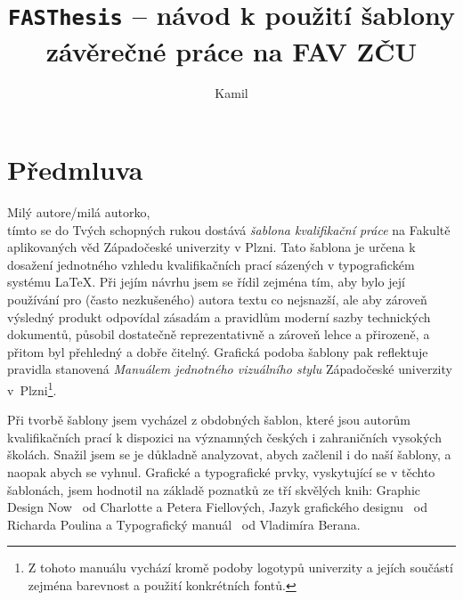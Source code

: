 \documentclass[czech, ing, kiv, he, iso690alph]{fasthesis}
\title{\texttt{FASThesis} -- návod k použití šablony závěrečné práce na FAV ZČU}
\author{Kamil}{Ekštein}{Ing.}{Ph.D.}
\begin{document}
\frontpages[tm] %
\tableofcontents
% 
%
\makeatletter%
\ifx\FASThesis@style\c@fullcolor%
\else%
\fi%
\makeatother%
%
%
%
%
\chapter*[Předmluva]{Předmluva}
Milý autore/milá autorko,\\[\baselineskip]
tímto se do Tvých schopných rukou dostává \emph{šablona kvalifikační práce} na Fakultě aplikovaných věd Západočeské univerzity v Plzni. Tato šablona je určena k dosažení jednotného vzhledu kvalifikačních prací sázených v typografickém systému \LaTeX. Při jejím návrhu jsem se řídil zejména tím, aby bylo její používání pro (často nezkušeného) autora textu co nejsnazší, ale aby zároveň výsledný produkt odpovídal zásadám a pravidlům moderní sazby technických dokumentů, působil dostatečně reprezentativně a zároveň lehce a přirozeně, a přitom byl přehledný a dobře čitelný. Grafická podoba šablony pak reflektuje pravidla stanovená \emph{Manuálem jednotného vizuálního stylu} Západočeské univerzity v~Plzni\footnote{Z tohoto manuálu vychází kromě podoby logotypů univerzity a jejích součástí zejména barevnost a použití konkrétních fontů.}.

Při tvorbě šablony jsem vycházel z obdobných šablon, které jsou autorům kvalifikačních prací k dispozici na významných českých i zahraničních vysokých školách. Snažil jsem se je důkladně analyzovat, abych  začlenil i do naší šablony, a naopak  abych se vyhnul. Grafické a typografické prvky, vyskytující se v těchto šablonách, jsem hodnotil na základě poznatků ze tří skvělých knih: Graphic Design Now~\cite{Fiells2005} od Charlotte a Petera Fiellových, Jazyk grafického designu~\cite{Poulin2012} od Richarda Poulina a Typografický manuál~\cite{Beran2016} od Vladimíra Berana.
\end{document}
